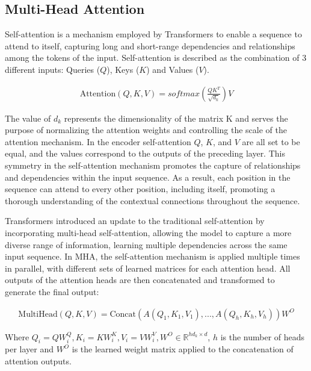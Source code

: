 \subsection{Multi-Head Attention}

Self-attention is a mechanism employed by Transformers to enable a sequence to attend to itself, capturing long and short-range dependencies and relationships among the tokens of the input. Self-attention is described as the combination of 3 different inputs: Queries ($Q$), Keys ($K$) and Values ($V$).

\begin{equation}
    \begin{gathered}
        \text{Attention}(Q,K,V) = softmax \left( \frac{QK^T}{\sqrt{d_k} } \right) V
    \end{gathered}
    \label{eq:self_attention}
\end{equation}

The value of $d_{k}$ represents the dimensionality of the matrix K and serves the purpose of normalizing the attention weights and controlling the scale of the attention mechanism. In the encoder self-attention $Q$, $K$, and $V$ are all set to be equal, and the values correspond to the outputs of the preceding layer. This symmetry in the self-attention mechanism promotes the capture of relationships and dependencies within the input sequence. As a result, each position in the sequence can attend to every other position, including itself, promoting a thorough understanding of the contextual connections throughout the sequence.

Transformers introduced an update to the traditional self-attention by incorporating multi-head self-attention, allowing the model to capture a more diverse range of information, learning multiple dependencies across the same input sequence. In MHA, the self-attention mechanism is applied multiple times in parallel, with different sets of learned matrices for each attention head. All outputs of the attention heads are then concatenated and transformed to generate the final output:

\begin{equation}
    \begin{gathered}
        \text{MultiHead}(Q,K,V) = \text{Concat}\left( A(Q_{1}, K_{1}, V_{1}), ...,  A(Q_{h}, K_{h}, V_{h})\right) W^{O}
    \end{gathered}
    \label{eq:mha}
\end{equation}

Where $Q_{i} = QW_{i}^{Q}, K_{i} = KW_{i}^{K}, V_{i} = VW_{i}^{V}, W^{O} \in \mathbb{R}^{hd_{k} \times d}$, $h$ is the number of heads per layer and $W^{O}$ is the learned weight matrix applied to the concatenation of attention outputs.

